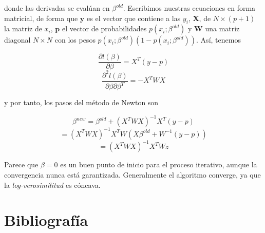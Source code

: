   donde las derivadas se evalúan en $\beta^{old}$. Escribimos nuestras ecuaciones en forma matricial, de forma que $\textbf{y}$ es el vector que contiene a las $y_i$, $\textbf{X}$, de $N \times (p+1)$ la matriz de $x_i$, $\textbf{p}$   el vector de probabilidades $p(x_i;\beta^{old})$ y $\textbf{W}$ una matriz diagonal $N \times N$ con los pesos $p(x_i;\beta^{old})(1-p(x_i;\beta^{old}))$. Así, tenemos
  
  $$\frac{\partial l(\beta)}{\partial \beta} = X^T(y-p)$$
  $$\frac{\partial^2 l(\beta)}{\partial \beta \partial \beta^T} = -X^TWX$$
  
  y por tanto, los pasos del método de Newton son
  
  $$\beta^{new} = \beta^{old} + (X^TWX)^{-1}X^T(y-p)$$
  $$ = (X^TWX)^{-1} X^T W(X \beta^{old}+W^{-1}(y-p))$$
  $$ = (X^TWX)^{-1} X^T Wz$$
  
  Parece que $\beta = 0$ es un buen punto de inicio para el proceso iterativo, aunque la convergencia nunca está garantizada. Generalmente el algoritmo converge, ya que la \textit{log-verosimilitud} es cóncava.
  
\newpage
\section{Bibliografía}







\appendix
\clearpage
\addappheadtotoc
\appendixpage



 


